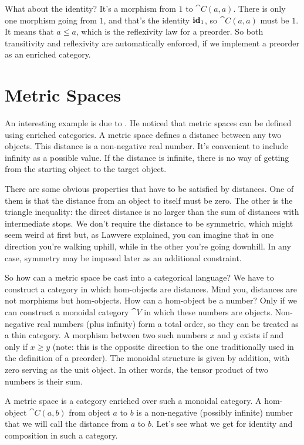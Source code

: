 What about the identity? It's a morphism from $1$ to $\cat{C}(a, a)$.
There is only one morphism going from $1$, and that's the identity
$\idarrow[1]$, so $\cat{C}(a, a)$ must be $1$. It means that
$a \leqslant a$, which is the reflexivity law for a
preorder. So both transitivity and reflexivity are automatically
enforced, if we implement a preorder as an enriched category.

\section{Metric Spaces}

An interesting example is due to
. He noticed that metric spaces can be defined using enriched
categories. A metric space defines a distance between any two objects.
This distance is a non-negative real number. It's convenient to include
infinity as a possible value. If the distance is infinite, there is no
way of getting from the starting object to the target object.

There are some obvious properties that have to be satisfied by
distances. One of them is that the distance from an object to itself
must be zero. The other is the triangle inequality: the direct distance
is no larger than the sum of distances with intermediate stops. We don't
require the distance to be symmetric, which might seem weird at first
but, as Lawvere explained, you can imagine that in one direction you're
walking uphill, while in the other you're going downhill. In any case,
symmetry may be imposed later as an additional constraint.

So how can a metric space be cast into a categorical language? We have
to construct a category in which hom-objects are distances. Mind you,
distances are not morphisms but hom-objects. How can a hom-object be a
number? Only if we can construct a monoidal category $\cat{V}$ in which
these numbers are objects. Non-negative real numbers (plus infinity)
form a total order, so they can be treated as a thin category. A
morphism between two such numbers $x$ and $y$ exists if
and only if $x \geqslant y$ (note: this is the opposite
direction to the one traditionally used in the definition of a
preorder). The monoidal structure is given by addition, with zero
serving as the unit object. In other words, the tensor product of two
numbers is their sum.

A metric space is a category enriched over such a monoidal category. A
hom-object $\cat{C}(a, b)$ from object $a$ to $b$ is a
non-negative (possibly infinite) number that we will call the distance
from $a$ to $b$. Let's see what we get for identity and
composition in such a category.

